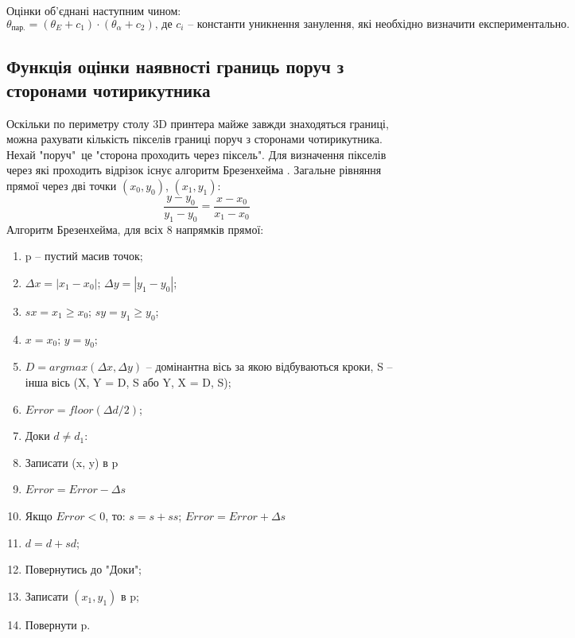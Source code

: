 \documentclass[a4paper,14pt]{report}
\begin{document}
Оцінки об'єднані наступним чином:
\[
\theta_{\text{пар.}} = (\theta_E + c_1) \cdot (\theta_\alpha + c_2)\text{, де }c_i\text{ -- константи уникнення занулення, які необхідно визначити експериментально.}
\]

\subsection{Функція оцінки наявності границь поруч з сторонами чотирикутника}
Оскільки по периметру столу 3D принтера майже завжди знаходяться границі, можна рахувати кількість пікселів границі поруч з сторонами чотирикутника. 
Нехай "поруч"\ це "сторона проходить через піксель". 
Для визначення пікселів через які проходить відрізок існує алгоритм Брезенхейма \cite{bresenham}. 
Загальне рівняння прямої через дві точки $(x_0, y_0)$, $(x_1, y_1)$:
\[
\frac{y-y_0}{y_1-y_0} = \frac{x-x_0}{x_1 - x_0}
\]
Алгоритм Брезенхейма, для всіх 8 напрямків прямої:
\begin{enumerate}
  \item p -- пустий масив точок;
  \item $\Delta x = |x_1 - x_0|$; $\Delta y = |y_1 - y_0|$;
  \item $sx = x_1 \geq x_0$; $sy = y_1 \geq y_0$;
  \item $x = x_0$; $y = y_0$;
  \item $D = argmax(\Delta x, \Delta y)$ -- домінантна вісь за якою відбуваються кроки, S -- інша вісь (X, Y = D, S або Y, X = D, S);
  \item $Error = floor(\Delta d / 2)$;
  \item Доки $d \neq d_1$:
  \item Записати (x, y) в p
  \item $Error = Error -  \Delta s$
  \item Якщо $Error < 0$, то: $s = s + ss$; $Error = Error + \Delta s$
  \item $d = d + sd$;
  \item Повернутись до "Доки";
  \item Записати $(x_1, y_1)$ в p;
  \item Повернути p.
\end{enumerate}
\end{document}
